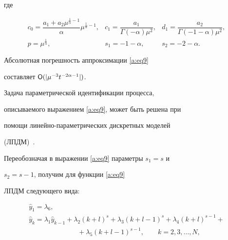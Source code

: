 где

\begin{equation}\label{f2_1_28}

\begin{array}{ccc}

c_0=\dfrac{a_1+a_2 \mu ^{\frac{1}{\alpha}-1}}{\alpha} \mu ^ {\frac{1}{\alpha}-1},

&

c_1=\dfrac{a_1}{\Gamma(-\alpha)\mu^2},

&

d_1=\dfrac{a_2}{\Gamma(-1-\alpha) \mu^2}, \\

p=\mu ^ {\frac{1}{\alpha}},

&

s_1=-1-\alpha, &

s_2=-2-\alpha.

\end{array}

\end{equation}

Абсолютная погрешность аппроксимации  \eqref{a:eq9}

составляет ${\sf O}({|\mu^{-3} t^{-2\alpha-1}|})$.



Задача параметрической идентификации про\-цес\-са,

опи\-сы\-ваемо\-го выражением \eqref{a:eq9}, может быть решена при

помощи линейно-параметрических дискретных моделей

(ЛПДМ)~\cite{v:Z}.


Переобозначая в выражении \eqref{a:eq9} параметры $s_1=s$ и

$s_2=s-1$, получим для функции \eqref{a:eq9}


ЛПДМ следующего вида:

\begin{equation}\label{a:eq91}

\begin{array}{l}

{\hat{y}}_1= \lambda_6,\\

\hat{y}_k= \lambda_1\hat{y}_{k-1}+\lambda_2 (k+l)^s +\lambda_3(k+l-1)^s +\lambda_4 (k+l)^{s-1} +\\

\hspace{3cm}

+\lambda_5(k+l-1)^{s-1}, \qquad k=2, 3, \dots, N,

\end{array}

\end{equation}

